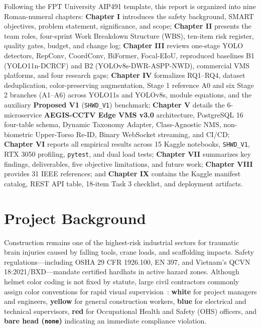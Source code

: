 Following the FPT University AIP491 template, this report is organized into nine Roman-numeral chapters: \textbf{Chapter I} introduces the safety background, SMART objectives, problem statement, significance, and scope; \textbf{Chapter II} presents the team roles, four-sprint Work Breakdown Structure (WBS), ten-item risk register, quality gates, budget, and change log; \textbf{Chapter III} reviews one-stage YOLO detectors, RepConv, CoordConv, BiFormer, Focal-EIoU, reproduced baselines B1 (YOLO11n-DCRCF) and B2 (YOLOv8s-DWR-ASPP-NWD), commercial VMS platforms, and four research gaps; \textbf{Chapter IV} formalizes RQ1--RQ4, dataset deduplication, color-preserving augmentation, Stage 1 reference A0 and six Stage 2 branches (A1--A6) across YOLO11s and YOLOv8s, module equations, and the auxiliary \textbf{Proposed V1} (\texttt{SHWD\_V1}) benchmark; \textbf{Chapter V} details the 6-microservice \textbf{AEGIS-CCTV Edge VMS v3.0} architecture, PostgreSQL 16 four-table schema, Dynamic Taxonomy Adapter, Class-Agnostic NMS, non-biometric Upper-Torso Re-ID, Binary WebSocket streaming, and CI/CD; \textbf{Chapter VI} reports all empirical results across 15 Kaggle notebooks, \texttt{SHWD\_V1}, RTX 3050 profiling, \texttt{pytest}, and dual load tests; \textbf{Chapter VII} summarizes key findings, deliverables, five objective limitations, and future work; \textbf{Chapter VIII} provides 31 IEEE references; and \textbf{Chapter IX} contains the Kaggle manifest catalog, REST API table, 18-item Task 3 checklist, and deployment artifacts.

\section{Project Background}

Construction remains one of the highest-risk industrial sectors for traumatic brain injuries caused by falling tools, crane loads, and scaffolding impacts. Safety regulations---including OSHA 29 CFR 1926.100, EN 397, and Vietnam's QCVN 18:2021/BXD---mandate certified hardhats in active hazard zones. Although helmet color coding is not fixed by statute, large civil contractors commonly assign color conventions for rapid visual supervision~\cite{wu2019hardhats,wang2021fast}: \textbf{white} for project managers and engineers, \textbf{yellow} for general construction workers, \textbf{blue} for electrical and technical supervisors, \textbf{red} for Occupational Health and Safety (OHS) officers, and \textbf{bare head (\texttt{none})} indicating an immediate compliance violation.

